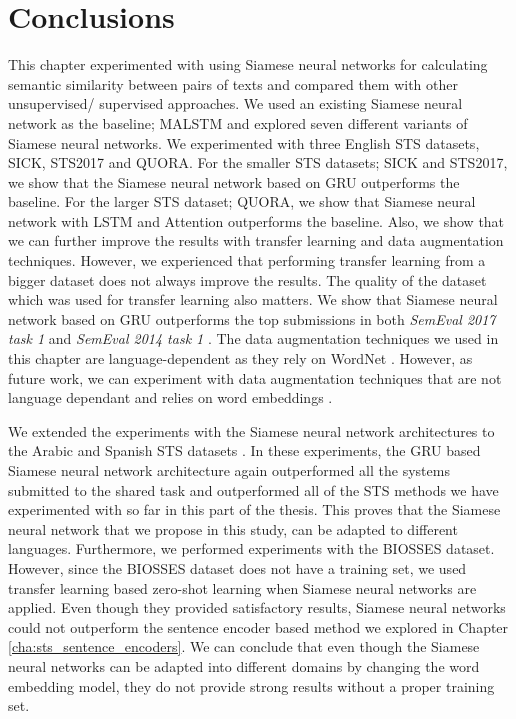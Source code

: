\section{Conclusions}
\label{sec:siamese_conclusions}
This chapter experimented with using Siamese neural networks for calculating semantic similarity between pairs of texts and compared them with other unsupervised/ supervised approaches. We used an existing Siamese neural network as the baseline; MALSTM \autocite{Mueller_Thyagarajan_2016} and explored seven different variants of Siamese neural networks. We experimented with three English STS datasets, SICK, STS2017 and QUORA. For the smaller STS datasets; SICK and STS2017, we show that the Siamese neural network based on GRU outperforms the baseline. For the larger STS dataset; QUORA, we show that Siamese neural network with LSTM and Attention outperforms the baseline. Also, we show that we can further improve the results with transfer learning and data augmentation techniques. However, we experienced that performing transfer learning from a bigger dataset does not always improve the results. The quality of the dataset which was used for transfer learning also matters. We show that Siamese neural network based on GRU outperforms the top submissions in both \textit{SemEval 2017 task 1} \autocite{cer-etal-2017-semeval} and  \textit{SemEval 2014 task 1} \autocite{marelli-etal-2014-semeval}. The data augmentation techniques we used in this chapter are language-dependent as they rely on WordNet \autocite{10.1145/219717.219748}. However, as future work, we can experiment with data augmentation techniques that are not language dependant and relies on word embeddings \autocite{kumar-etal-2020-data}. 

We extended the experiments with the Siamese neural network architectures to the Arabic and Spanish STS datasets \autocite{cer-etal-2017-semeval}. In these experiments, the GRU based Siamese neural network architecture again outperformed all the systems submitted to the shared task and outperformed all of the STS methods we have experimented with so far in this part of the thesis. This proves that the Siamese neural network that we propose in this study, can be adapted to different languages. Furthermore, we performed experiments with the BIOSSES dataset. However, since the BIOSSES dataset does not have a training set, we used transfer learning based zero-shot learning when Siamese neural networks are applied. Even though they provided satisfactory results, Siamese neural networks could not outperform the sentence encoder based method we explored in Chapter \ref{cha:sts_sentence_encoders}. We can conclude that even though the Siamese neural networks can be adapted into different domains by changing the word embedding model, they do not provide strong results without a proper training set. 

